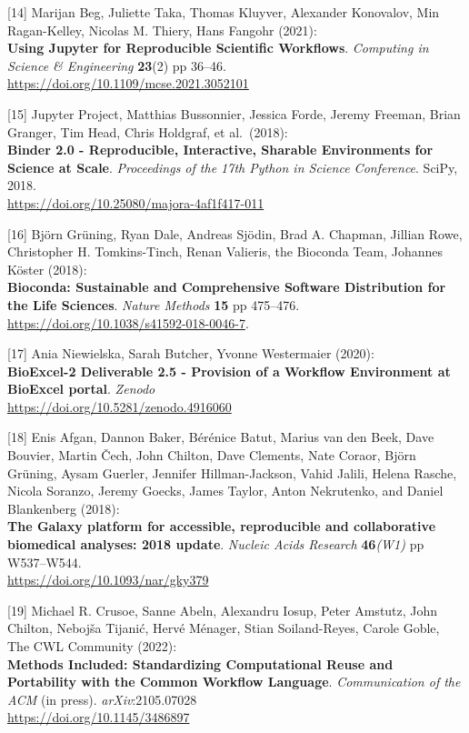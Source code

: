{[}14{]} Marijan Beg, Juliette Taka, Thomas Kluyver, Alexander
Konovalov, Min Ragan-Kelley, Nicolas M. Thiery, Hans Fangohr (2021):\\
\textbf{Using Jupyter for Reproducible Scientific Workflows}.
\emph{Computing in Science \& Engineering} \textbf{23}(2) pp 36--46.\\
\url{https://doi.org/10.1109/mcse.2021.3052101}

{[}15{]} Jupyter Project, Matthias Bussonnier, Jessica Forde, Jeremy
Freeman, Brian Granger, Tim Head, Chris Holdgraf, et al.~(2018):\\
\textbf{Binder 2.0 - Reproducible, Interactive, Sharable Environments
for Science at Scale}. \emph{Proceedings of the 17th Python in Science
Conference}. SciPy, 2018.\\
\url{https://doi.org/10.25080/majora-4af1f417-011}

{[}16{]} Björn Grüning, Ryan Dale, Andreas Sjödin, Brad A. Chapman,
Jillian Rowe, Christopher H. Tomkins-Tinch, Renan Valieris, the Bioconda
Team, Johannes Köster (2018):\\
\textbf{Bioconda: Sustainable and Comprehensive Software Distribution
for the Life Sciences}. \emph{Nature Methods} \textbf{15} pp 475--476.\\
\url{https://doi.org/10.1038/s41592-018-0046-7}.

{[}17{]} Ania Niewielska, Sarah Butcher, Yvonne Westermaier (2020):\\
\textbf{BioExcel-2 Deliverable 2.5 - Provision of a Workflow Environment
at BioExcel portal}. \emph{Zenodo}\\
\url{https://doi.org/10.5281/zenodo.4916060}

{[}18{]} Enis Afgan, Dannon Baker, Bérénice Batut, Marius van den Beek,
Dave Bouvier, Martin Čech, John Chilton, Dave Clements, Nate Coraor,
Björn Grüning, Aysam Guerler, Jennifer Hillman-Jackson, Vahid Jalili,
Helena Rasche, Nicola Soranzo, Jeremy Goecks, James Taylor, Anton
Nekrutenko, and Daniel Blankenberg (2018):\\
\textbf{The Galaxy platform for accessible, reproducible and
collaborative biomedical analyses: 2018 update}. \emph{Nucleic Acids
Research} \textbf{46}\emph{(W1)} pp W537--W544.\\
\url{https://doi.org/10.1093/nar/gky379}

{[}19{]} Michael R. Crusoe, Sanne Abeln, Alexandru Iosup, Peter Amstutz,
John Chilton, Nebojša Tijanić, Hervé Ménager, Stian Soiland-Reyes,
Carole Goble, The CWL Community (2022):\\
\textbf{Methods Included: Standardizing Computational Reuse and
Portability with the Common Workflow Language}. \emph{Communication of
the ACM} (in press). \emph{arXiv}:2105.07028\\
\url{https://doi.org/10.1145/3486897}

